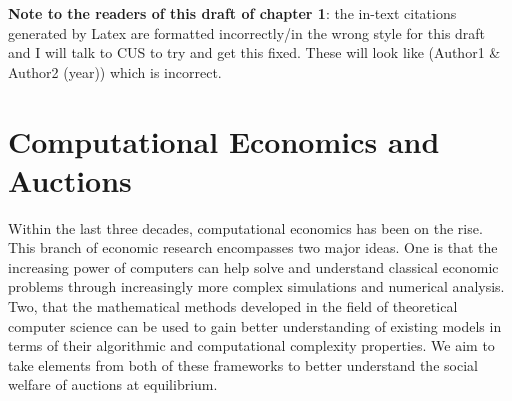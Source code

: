 \documentclass[12pt,twoside]{reedthesis}
\begin{document}
	\textbf{Note to the readers of this draft of chapter 1}: the in-text citations generated by Latex are formatted incorrectly/in the wrong style for this draft and I will talk to CUS to try and get this fixed. These will look like (Author1 \& Author2 (year)) which is incorrect.

\chapter{Computational Economics and Auctions}
	Within the last three decades, computational economics has been on the rise. This branch of economic research encompasses two major ideas. One is that the increasing power of computers can help solve and understand classical economic problems through increasingly more complex simulations and numerical analysis. Two, that the mathematical methods developed in the field of theoretical computer science can be used to gain better understanding of existing models in terms of their algorithmic and computational complexity properties. We aim to take elements from both of these frameworks to better understand the social welfare of auctions at equilibrium. 
\end{document}
